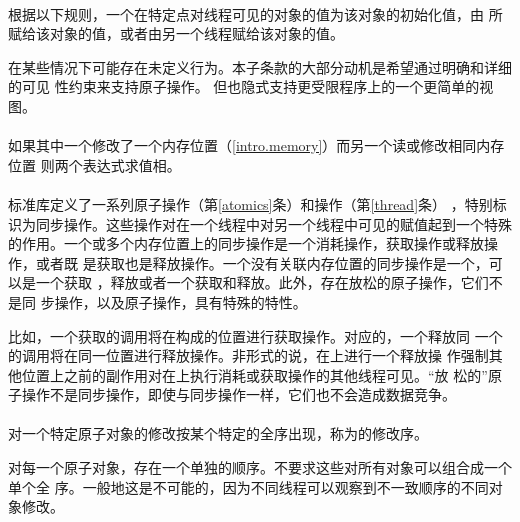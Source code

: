 \paragraph{} %
根据以下规则，一个在特定点对线程可见的对象的值为该对象的初始化值，由
所赋给该对象的值，或者由另一个线程赋给该对象的值。

\begin{note}
  在某些情况下可能存在未定义行为。本子条款的大部分动机是希望通过明确和详细的可见
  性约束来支持原子操作。 但也隐式支持更受限程序上的一个更简单的视图。
\end{note}

\paragraph{} %
如果其中一个修改了一个内存位置（\ref{intro.memory}）而另一个读或修改相同内存位置
则两个表达式求值相。

\paragraph{} %
标准库定义了一系列原子操作（第\ref{atomics}条）和\mtx{}操作（第\ref{thread}条）
，特别标识为同步操作。这些操作对在一个线程中对另一个线程中可见的赋值起到一个特殊
的作用。一个或多个内存位置上的同步操作是一个消耗操作，获取操作或释放操作，或者既
是获取也是释放操作。一个没有关联内存位置的同步操作是一个\fnc{}，可以是一个获取
\fnc{}，释放\fnc{}或者一个获取和释放\fnc{}。此外，存在放松的原子操作，它们不是同
步操作，以及原子\rmw{}操作，具有特殊的特性。

\begin{note}
  比如，一个获取\mtx{}的调用将在构成\mtx{}的位置进行获取操作。对应的，一个释放同
  一个\mtx{}的调用将在同一位置进行释放操作。非形式的说，在上进行一个释放操
  作强制其他位置上之前的副作用对在上执行消耗或获取操作的其他线程可见。“放
  松的”原子操作不是同步操作，即使与同步操作一样，它们也不会造成数据竞争。
\end{note}

\paragraph{} %
对一个特定原子对象的修改按某个特定的全序出现，称为的修改序。

\begin{note}
  对每一个原子对象，存在一个单独的顺序。不要求这些对所有对象可以组合成一个单个全
  序。一般地这是不可能的，因为不同线程可以观察到不一致顺序的不同对象修改。
\end{note}

